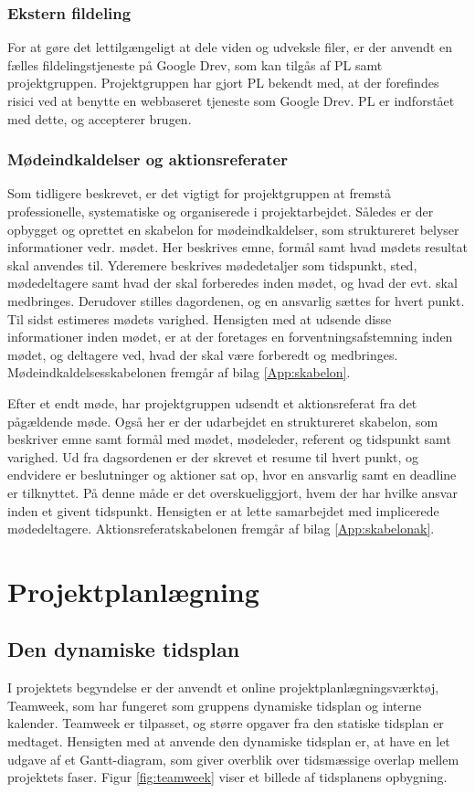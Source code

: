	\subsubsection{Ekstern fildeling}
	For at gøre det lettilgængeligt at dele viden og udveksle filer, er der anvendt en fælles fildelingstjeneste på Google Drev, som kan tilgås af PL samt projektgruppen.  
	Projektgruppen har gjort PL bekendt med, at der forefindes risici ved at benytte en webbaseret tjeneste som Google Drev. PL er indforstået med dette, og accepterer brugen.
	 
	\subsubsection{Mødeindkaldelser og aktionsreferater}
	Som tidligere beskrevet, er det vigtigt for projektgruppen at fremstå professionelle, systematiske og organiserede i projektarbejdet. Således er der opbygget og oprettet en skabelon for mødeindkaldelser, som struktureret belyser informationer vedr. mødet. Her beskrives emne, formål samt hvad mødets resultat skal anvendes til. Yderemere beskrives mødedetaljer som tidspunkt, sted, mødedeltagere samt hvad der skal forberedes inden mødet, og hvad der evt. skal medbringes. Derudover stilles dagordenen, og en ansvarlig sættes for hvert punkt. Til sidst estimeres mødets varighed. Hensigten med at udsende disse informationer inden mødet, er at der foretages en forventningsafstemning inden mødet, og deltagere ved, hvad der skal være forberedt og medbringes. Mødeindkaldelsesskabelonen fremgår af bilag \ref{App:skabelon}.  
	
	Efter et endt møde, har projektgruppen udsendt et aktionsreferat fra det pågældende møde. Også her er der udarbejdet en struktureret skabelon, som beskriver emne samt formål med mødet, mødeleder, referent og tidspunkt samt varighed. Ud fra dagsordenen er der skrevet et resume til hvert punkt, og endvidere er beslutninger og aktioner sat op, hvor en ansvarlig samt en deadline er tilknyttet. På denne måde er det overskueliggjort, hvem der har hvilke ansvar inden et givent tidspunkt. Hensigten er at lette samarbejdet med implicerede mødedeltagere. Aktionsreferatskabelonen fremgår af bilag \ref{App:skabelonak}.        
	
\section{Projektplanlægning}  
\subsection{Den dynamiske tidsplan} 
I projektets begyndelse er der anvendt et online projektplanlægningsværktøj, Teamweek, som har fungeret som gruppens dynamiske tidsplan og interne kalender. Teamweek er tilpasset, og større opgaver fra den statiske tidsplan er medtaget. Hensigten med at anvende den dynamiske tidsplan er, at have en let udgave af et Gantt-diagram, som giver overblik over tidsmæssige overlap mellem projektets faser. Figur \ref{fig:teamweek} viser et billede af tidsplanens opbygning.  


